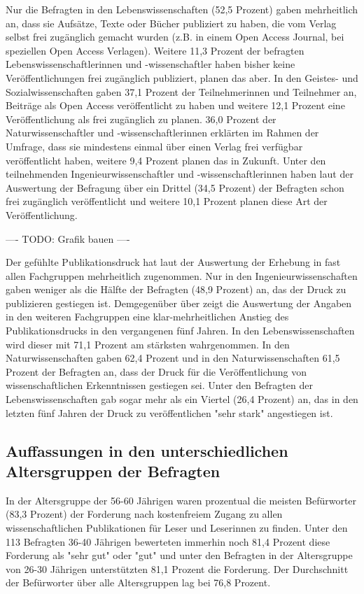 Nur die Befragten in den Lebenswissenschaften (52,5 Prozent) gaben mehrheitlich an, dass sie Aufsätze, Texte oder Bücher publiziert zu haben, die vom Verlag selbst frei zugänglich gemacht wurden (z.B. in einem Open Access Journal, bei speziellen Open Access Verlagen). Weitere 11,3 Prozent der befragten Lebenswissenschaftlerinnen und -wissenschaftler haben bisher keine Veröffentlichungen frei zugänglich publiziert, planen das aber. In den Geistes- und Sozialwissenschaften gaben 37,1 Prozent der Teilnehmerinnen und Teilnehmer an, Beiträge als Open Access veröffentlicht zu haben und weitere 12,1 Prozent eine Veröffentlichung als frei zugänglich zu planen. 36,0 Prozent der Naturwissenschaftler und -wissenschaftlerinnen erklärten im Rahmen der Umfrage, dass sie mindestens einmal über einen Verlag frei verfügbar veröffentlicht haben, weitere 9,4 Prozent planen das in Zukunft. Unter den teilnehmenden Ingenieurwissenschaftler und -wissenschaftlerinnen haben laut der Auswertung der Befragung über ein Drittel (34,5 Prozent) der Befragten schon frei zugänglich veröffentlicht und weitere 10,1 Prozent planen diese Art der Veröffentlichung.

---- TODO: Grafik bauen ----

Der gefühlte Publikationsdruck hat laut der Auswertung der Erhebung in fast allen Fachgruppen mehrheitlich zugenommen. Nur in den Ingenieurwissenschaften gaben weniger als die Hälfte der Befragten (48,9 Prozent) an, das der Druck zu publizieren gestiegen ist. Demgegenüber über zeigt die Auswertung der Angaben in den weiteren Fachgruppen eine klar-mehrheitlichen Anstieg des Publikationsdrucks in den vergangenen fünf Jahren. In den Lebenswissenschaften wird dieser mit 71,1 Prozent am stärksten wahrgenommen. In den Naturwissenschaften gaben 62,4 Prozent und in den Naturwissenschaften 61,5 Prozent der Befragten an, dass der Druck für die Veröffentlichung von wissenschaftlichen Erkenntnissen gestiegen sei. Unter den Befragten der Lebenswissenschaften gab sogar mehr als ein Viertel (26,4 Prozent) an, das in den letzten fünf Jahren der Druck zu veröffentlichen "sehr stark" angestiegen ist.

\subsection{Auffassungen in den unterschiedlichen Altersgruppen der Befragten}

In der Altersgruppe der 56-60 Jährigen waren prozentual die meisten Befürworter (83,3 Prozent) der Forderung nach kostenfreiem Zugang zu allen wissenschaftlichen Publikationen für Leser und Leserinnen zu finden. Unter den 113 Befragten 36-40 Jährigen bewerteten immerhin noch 81,4 Prozent diese Forderung als "sehr gut" oder "gut" und unter den Befragten in der Altersgruppe von 26-30 Jährigen unterstützten 81,1 Prozent die Forderung. Der Durchschnitt der Befürworter über alle Altersgruppen lag bei 76,8 Prozent.

